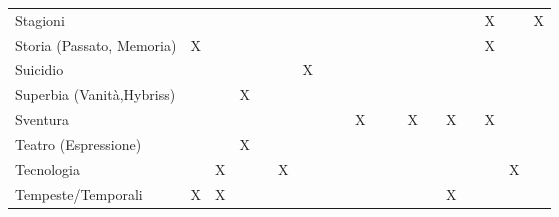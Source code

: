 \documentclass[10pt,a3paper]{memoir}
\begin{document}
\begin{table}[h]
\begin{tabular}{l|c|c|c|c|c|c|c|c|c|c|c|c|c|c|c|c|c|c}
Stagioni &  &  &  &  &  &  &  &  &  &  &  &  &  &  &  & X &  & X \\
Storia (Passato, Memoria) & X &  &  &  &  &  &  &  &  &  &  &  &  &  &  & X &  &  \\
Suicidio &  &  &  &  &  & X &  &  &  &  &  &  &  &  &  &  &  &  \\
Superbia (Vanit\`{a},Hybriss) &  &  & X &  &  &  &  &  &  &  &  &  &  &  &  &  &  &  \\
Sventura &  &  &  &  &  &  &  &  & X &  &  & X &  & X &  & X &  &  \\
Teatro (Espressione) &  &  & X &  &  &  &  &  &  &  &  &  &  &  &  &  &  &  \\
Tecnologia &  & X &  &  & X &  &  &  &  &  &  &  &  &  &  &  & X &  \\
Tempeste/Temporali & X & X &  &  &  &  &  &  &  &  &  &  &  & X &  &  &  &  \\		
\bottomrule
\end{tabular}
\end{table}
\end{document}
